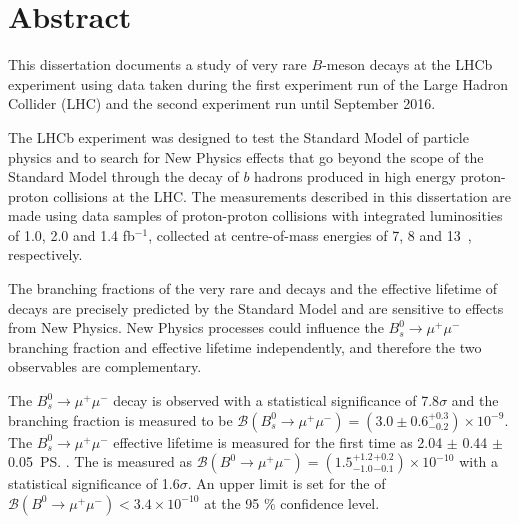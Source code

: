 \chapter{Abstract}

This dissertation documents a study of very rare $B$-meson decays at the LHCb experiment using data taken during the first experiment run of the Large Hadron Collider (LHC) and the second experiment run until September 2016.



The LHCb experiment was designed to test the Standard Model of particle physics and to search for New Physics effects that go beyond the scope of the Standard Model through the decay of $b$ hadrons produced in high energy proton-proton collisions at the LHC. The measurements described in this dissertation are made using data samples of proton-proton collisions with integrated luminosities of 1.0, 2.0 and 1.4 fb$^{-1}$, collected at centre-of-mass energies of 7, 8 and 13~\tev, respectively. %

The branching fractions of the very rare \bdmumu and \bsmumu decays and the effective lifetime of \bsmumu decays are precisely predicted by the Standard Model and are sensitive to effects from New Physics. 
New Physics processes could influence the $B_{s}^{0} \to \mu^{+} \mu^{-}$  branching fraction and effective lifetime independently, and therefore the two observables are complementary. %




The $B_{s}^{0} \to \mu^{+} \mu^{-}$ decay is observed with a statistical significance of 7.8$\sigma$ and the branching fraction is measured to be $\mathcal{B}(B_{s}^{0} \to \mu^{+} \mu^{-}) = (3.0 \pm 0.6^{ +0.3}_{ -0.2}) \times 10^{-9}$. The $B_{s}^{0} \to \mu^{+} \mu^{-}$ effective lifetime is measured for the first time as 2.04 $\pm$ 0.44 $\pm$ 0.05~\ps.
The \bdmumu \BF is measured as $\mathcal{B}(B^{0} \to \mu^{+} \mu^{-}) = (1.5^{+1.2}_{-1.0}^{+0.2}_{-0.1})\times 10^{-10}$ with a statistical significance of 1.6$\sigma$. An upper limit is set for the \BF of $\mathcal{B}(B^{0} \to \mu^{+} \mu^{-})< 3.4 \times 10^{-10}$ at the 95 $\%$ confidence level. 


